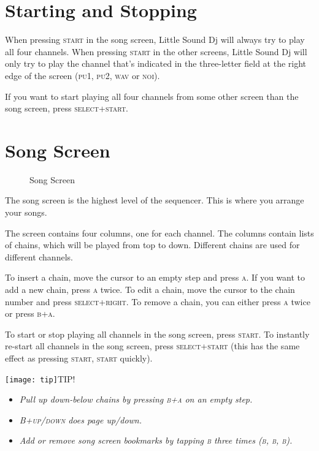 \section{Starting and Stopping}

When pressing \textsc{start} in the song screen, Little Sound Dj will always try to play all four
channels. When pressing \textsc{start} in the other screens, Little Sound Dj will only try to play the
channel that's indicated in the three-letter field at the right edge of the screen (\textsc{pu1}, \textsc{pu2}, \textsc{wav} or \textsc{noi}).

If you want to start playing all four channels from some other screen than the song screen,
press \textsc{select+start}.

\section{Song Screen}

\begin{figure}[hbtp]
\centering
{}
\caption{Song Screen}
\end{figure}

The song screen
is the highest level of the sequencer. This is where you arrange your songs.

The screen contains four columns, one for each channel. The columns contain lists of chains, which will be played from top to down. Different chains are used for different channels.

To insert a chain, move the cursor to an empty step and press \textsc{a}. If you want to add a new
chain, press \textsc{a} twice. To edit a chain, move the cursor to the chain number and press
\textsc{select+right}. To remove a chain, you can either press \textsc{a} twice or
press \textsc{b+a}.

To start or stop playing all channels in the song screen, press \textsc{start}. To instantly re-start all channels in the song screen, press \textsc{select+start} (this has the same effect as pressing \textsc{start, start} quickly).

\texttt{[image: tip]}TIP!
\begin{itemize}
\item \textit{Pull up down-below chains by pressing \textsc{b+a} on an empty step.}
\item \textit{\textsc{B+up/down} does page up/down.}
\item \textit{Add or remove song screen bookmarks by tapping \textsc{b} three times \textsc{(b, b, b)}.}
\end{itemize}

